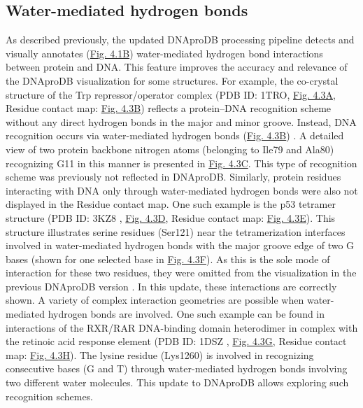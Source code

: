 \subsection{Water-mediated hydrogen bonds}
As described previously, the updated DNAproDB processing pipeline detects and visually annotates (\hyperref[fig:dnaprodb1]{Fig. 4.1B}) water-mediated hydrogen bond interactions between protein and DNA. This feature improves the accuracy and relevance of the DNAproDB visualization for some structures. For example, the co-crystal structure of the Trp repressor/operator complex (PDB ID: 1TRO, \hyperref[fig:dnaprodb3]{Fig. 4.3A}, Residue contact map: \hyperref[fig:dnaprodb3]{Fig. 4.3B}) reflects a protein–DNA recognition scheme without any direct hydrogen bonds in the major and minor groove. Instead, DNA recognition occurs via water-mediated hydrogen bonds (\hyperref[fig:dnaprodb3]{Fig. 4.3B}) \citep{Otwinowski1988}. A detailed view of two protein backbone nitrogen atoms (belonging to Ile79 and Ala80) recognizing G11 in this manner is presented in \hyperref[fig:dnaprodb3]{Fig. 4.3C}. This type of recognition scheme was previously not reflected in DNAproDB. Similarly, protein residues interacting with DNA only through water-mediated hydrogen bonds were also not displayed in the Residue contact map. One such example is the p53 tetramer structure (PDB ID: 3KZ8 \citep{Kitayner2010}, \hyperref[fig:dnaprodb3]{Fig. 4.3D}, Residue contact map: \hyperref[fig:dnaprodb3]{Fig. 4.3E}). This structure illustrates serine residues (Ser121) near the tetramerization interfaces involved in water-mediated hydrogen bonds with the major groove edge of two G bases (shown for one selected base in \hyperref[fig:dnaprodb3]{Fig. 4.3F}). As this is the sole mode of interaction for these two residues, they were omitted from the visualization in the previous DNAproDB version \citep{Sagendorf2020}. In this update, these interactions are correctly shown. A variety of complex interaction geometries are possible when water-mediated hydrogen bonds are involved. One such example can be found in interactions of the RXR/RAR DNA-binding domain heterodimer in complex with the retinoic acid response element (PDB ID: 1DSZ \citep{Rastinejad2000}, \hyperref[fig:dnaprodb3]{Fig. 4.3G}, Residue contact map: \hyperref[fig:dnaprodb3]{Fig. 4.3H}). The lysine residue (Lys1260) is involved in recognizing consecutive bases (G and T) through water-mediated hydrogen bonds involving two different water molecules. This update to DNAproDB allows exploring such recognition schemes. 

